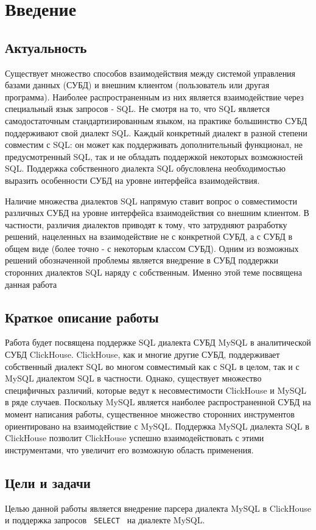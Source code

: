 \section{Введение}
\subsection{Актуальность}
Существует множество способов взаимодействия между системой управления базами данных (СУБД) и внешним клиентом (пользователь или другая программа). Наиболее распространенным из них является взаимодействие через специальный язык запросов - SQL. Не смотря на то, что SQL является самодостаточным стандартизированным языком, на практике большинство СУБД поддерживают свой диалект SQL. Каждый конкретный диалект в разной степени совместим с SQL: он может как поддерживать дополнительный функционал, не предусмотренный SQL, так и не обладать поддержкой некоторых возможностей SQL. Поддержка собственного диалекта SQL обусловлена необходимостью выразить особенности СУБД на уровне интерфейса взаимодействия.

Наличие множества диалектов SQL напрямую ставит вопрос о совместимости различных СУБД на уровне интерфейса взаимодействия со внешним клиентом. В частности, различия диалектов приводят к тому, что затрудняют разработку решений, нацеленных на взаимодействие не с конкретной СУБД, а с СУБД в общем виде (более точно - с некоторым классом СУБД). Одним из возможных решений обозначенной проблемы является внедрение в СУБД поддержки сторонних диалектов SQL наряду с собственным. Именно этой теме посвящена данная работа

\subsection{Краткое описание работы}
Работа будет посвящена поддержке SQL диалекта СУБД MySQL в аналитической СУБД ClickHouse. ClickHouse, как и многие другие СУБД, поддерживает собственный диалект SQL во многом совместимый как с SQL в целом, так и с MySQL диалектом SQL в частности. Однако, существует множество специфичных различий, которые ведут к несовместимости ClickHouse и MySQL в ряде случаев. Поскольку MySQL является наиболее распространенной СУБД на момент написания работы, существенное множество сторонних инструментов ориентировано на взаимодействие с MySQL. Поддержка MySQL диалекта SQL в ClickHouse позволит ClickHouse успешно взаимодействовать с этими инструментами, что увеличит его возможную область применения.  

\subsection{Цели и задачи}
Целью данной работы является внедрение парсера диалекта MySQL в ClickHouse и поддержка запросов \texttt{ SELECT } на диалекте MySQL. 

